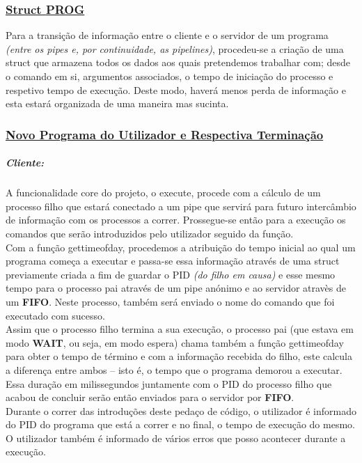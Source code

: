 \documentclass{report}
\begin{document}
\subsubsection{\underline{Struct \textbf{PROG}}}

Para a transição de informação entre o cliente e o servidor de um programa \textit{(entre os pipes e, por continuidade, as pipelines)}, procedeu-se a criação de uma struct que armazena todos os dados aos quais pretendemos trabalhar com; desde o comando em si, argumentos associados, o tempo de iniciação do processo e respetivo tempo de execução. Deste modo, haverá menos perda de informação e esta estará organizada de uma maneira mas sucinta.

\subsubsection{\underline{Novo Programa do Utilizador e Respectiva Terminação}}

\subparagraph{Cliente:}
A funcionalidade core do projeto, o execute, procede com a cálculo de um processo filho que estará conectado a um pipe que servirá para futuro intercâmbio de informação com os processos a correr. Prossegue-se então para a execução os comandos que serão introduzidos pelo utilizador seguido da função.\\

Com a função gettimeofday, procedemos a atribuição do tempo inicial ao qual um programa começa a executar e passa-se essa informação através de uma struct previamente criada a fim de guardar o PID \textit{(do filho em causa)} e esse mesmo tempo para o processo pai através de um pipe anónimo e ao servidor atravès de um \textbf{FIFO}. Neste processo, também será enviado o nome do comando que foi executado com sucesso.\\

Assim que o processo filho termina a sua execução, o processo pai (que estava em modo \textbf{WAIT}, ou seja, em modo espera) chama também a função gettimeofday para obter o tempo de término e com a informação recebida do filho, este calcula a diferença entre ambos – isto é, o tempo que o programa demorou a executar. Essa duração em milissegundos juntamente com o PID do processo filho que acabou de concluir serão então enviados para o servidor por \textbf{FIFO}.\\

Durante o correr das introduções deste pedaço de código, o utilizador é informado do PID do programa que está a correr e no final, o tempo de execução do mesmo. O utilizador também é informado de vários erros que posso acontecer durante a execução.
\end{document}
